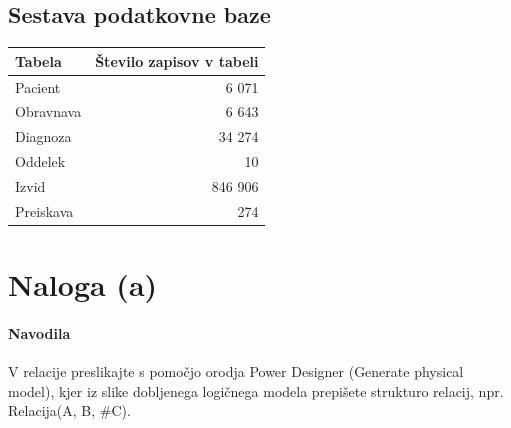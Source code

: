 \documentclass[a4paper,12pt]{report}
\begin{document}
\subsection{Sestava podatkovne baze} 

\begin{center}
    \begin{tabular}{||l|r||}
        \hline
        \textbf{Tabela} & \textbf{Število zapisov v tabeli} \\
        \hline
        Pacient & 6 071 \\
        Obravnava & 6 643\\
        Diagnoza & 34 274\\
        Oddelek & 10\\
        Izvid & 846 906 \\
        Preiskava & 274\\
        \hline
    \end{tabular}
\end{center}

 \section*{Naloga (a)}

\paragraph{Navodila}
\begin{em}
  V relacije preslikajte s pomočjo orodja Power Designer (Generate physical model), kjer iz slike dobljenega logičnega modela prepišete strukturo relacij, npr. Relacija(A, B, \#C).
\end{em}
\end{document}
